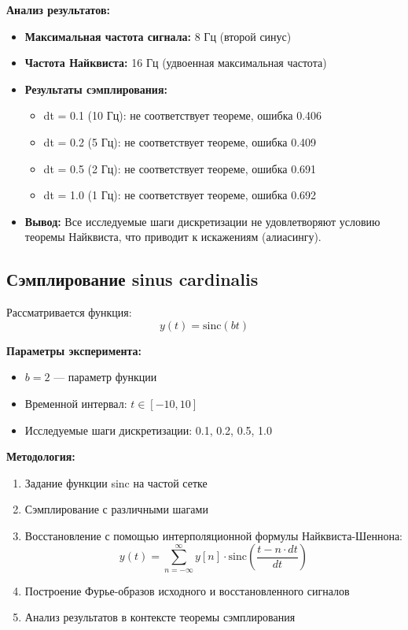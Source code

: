 \textbf{Анализ результатов:}
\begin{itemize}
    \item \textbf{Максимальная частота сигнала:} 8 Гц (второй синус)
    \item \textbf{Частота Найквиста:} 16 Гц (удвоенная максимальная частота)
    \item \textbf{Результаты сэмплирования:}
    \begin{itemize}
        \item dt = 0.1 (10 Гц): не соответствует теореме, ошибка 0.406
        \item dt = 0.2 (5 Гц): не соответствует теореме, ошибка 0.409
        \item dt = 0.5 (2 Гц): не соответствует теореме, ошибка 0.691
        \item dt = 1.0 (1 Гц): не соответствует теореме, ошибка 0.692
    \end{itemize}
    \item \textbf{Вывод:} Все исследуемые шаги дискретизации не удовлетворяют условию теоремы Найквиста, что приводит к искажениям (алиасингу).
\end{itemize}

\subsection*{Сэмплирование sinus cardinalis}

Рассматривается функция:
\begin{equation}
y(t) = \text{sinc}(bt)
\end{equation}

\textbf{Параметры эксперимента:}
\begin{itemize}
    \item $b = 2$ — параметр функции
    \item Временной интервал: $t \in [-10, 10]$
    \item Исследуемые шаги дискретизации: 0.1, 0.2, 0.5, 1.0
\end{itemize}

\textbf{Методология:}
\begin{enumerate}
    \item Задание функции sinc на частой сетке
    \item Сэмплирование с различными шагами
    \item Восстановление с помощью интерполяционной формулы Найквиста-Шеннона:
    \begin{equation}
    y(t) = \sum_{n=-\infty}^{\infty} y[n] \cdot \text{sinc}\left(\frac{t - n \cdot dt}{dt}\right)
    \end{equation}
    \item Построение Фурье-образов исходного и восстановленного сигналов
    \item Анализ результатов в контексте теоремы сэмплирования
\end{enumerate}

